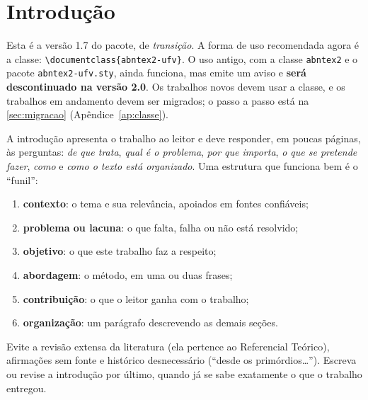 \chapter{Introdução}\label{sec:introducao}

\begin{dica}
Esta é a versão 1.7 do pacote, de \emph{transição}. A forma de uso recomendada agora é a
classe: \texttt{\textbackslash documentclass\{abntex2-ufv\}}. O uso antigo, com a classe
\texttt{abntex2} e o pacote \texttt{abntex2-ufv.sty}, ainda funciona, mas emite um aviso e
\textbf{será descontinuado na versão 2.0}. Os trabalhos novos devem usar a classe, e os
trabalhos em andamento devem ser migrados; o passo a passo está na
\autoref{sec:migracao} (Apêndice~\ref{ap:classe}).
\end{dica}

\begin{dica}
A introdução apresenta o trabalho ao leitor e deve responder, em poucas páginas,
às perguntas: \emph{de que trata}, \emph{qual é o problema}, \emph{por que
importa}, \emph{o que se pretende fazer}, \emph{como} e \emph{como o texto está
organizado}. Uma estrutura que funciona bem é o ``funil'':
\begin{enumerate}
  \item \textbf{contexto}: o tema e sua relevância, apoiados em fontes confiáveis;
  \item \textbf{problema ou lacuna}: o que falta, falha ou não está resolvido;
  \item \textbf{objetivo}: o que este trabalho faz a respeito;
  \item \textbf{abordagem}: o método, em uma ou duas frases;
  \item \textbf{contribuição}: o que o leitor ganha com o trabalho;
  \item \textbf{organização}: um parágrafo descrevendo as demais seções.
\end{enumerate}
Evite a revisão extensa da literatura (ela pertence ao Referencial Teórico),
afirmações sem fonte e histórico desnecessário (``desde os primórdios\ldots'').
Escreva ou revise a introdução por último, quando já se sabe exatamente o que o
trabalho entregou.
\end{dica}


